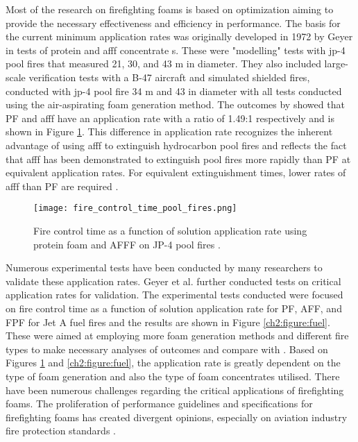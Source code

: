 Most of the research on firefighting foams is based on optimization aiming to provide the necessary effectiveness and efficiency in performance. The basis for the current minimum application rates was originally developed in 1972 by Geyer \cite{geyer1972evaluation} in tests of protein and \acrshort{afff} concentrate s. These were "modelling" tests with \acrfull{jp-4} pool fires that measured 21, 30, and 43 m in diameter. They also included large-scale verification tests with a B-47 aircraft and simulated shielded fires, conducted with \acrshort{jp-4} pool fire 34 m and 43 in diameter with all tests conducted using the air-aspirating foam generation method. The outcomes by \cite{geyer1972evaluation} showed that PF and \acrshort{afff} have an application rate with a ratio of 1.49:1 respectively and is shown in Figure \ref{ch2:figure:pool}. This difference in application rate recognizes the inherent advantage of using \acrshort{afff} to extinguish hydrocarbon pool fires and reflects the fact that \acrshort{afff} has been demonstrated to extinguish pool fires more rapidly than PF at equivalent application rates. For equivalent extinguishment times, lower rates of \acrshort{afff} than PF are required \cite{scheffey1995evaluating}.

\begin{figure}[H]
    \centering
    \texttt{[image: fire\_control\_time\_pool\_fires.png]}
    \caption{Fire control time as a function of solution application rate using protein foam and AFFF on JP-4 pool fires \cite{geyer1972evaluation}.}
    \label{ch2:figure:pool}
\end{figure}

Numerous experimental tests have been conducted by many researchers to validate these application rates. Geyer et al. \cite{geyer1979comparative} further conducted tests on critical application rates for validation. The experimental tests conducted were focused on fire control time as a function of solution application rate for PF, AFF, and FPF for Jet A fuel fires and the results are shown in Figure \ref{ch2:figure:fuel}. These were aimed at employing more foam generation methods and different fire types to make necessary analyses of outcomes and compare with \cite{geyer1972evaluation}. Based on Figures \ref{ch2:figure:pool} and \ref{ch2:figure:fuel}, the application rate is greatly dependent on the type of foam generation and also the type of foam concentrates utilised. There have been numerous challenges regarding the critical applications of firefighting foams. The proliferation of performance guidelines and specifications for firefighting foams has created divergent opinions, especially on aviation industry fire protection standards \cite{scheffey1995evaluating}.

